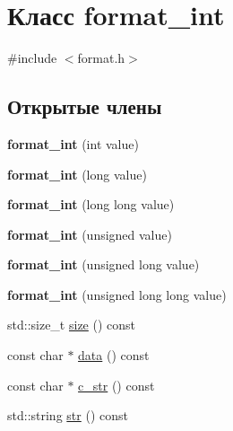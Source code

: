 \hypertarget{classformat__int}{}\section{Класс format\+\_\+int}
\label{classformat__int}


{\ttfamily \#include $<$format.\+h$>$}

\subsection*{Открытые члены}
\begin{DoxyCompactItemize}
\item 
\mbox{\label{classformat__int_a3664fa2bb28b1636eb2ceb8f2a28c5d3}} 
{\bfseries format\+\_\+int} (int value)
\item 
\mbox{\label{classformat__int_a473c02889ad9139f7b6c008de5be9224}} 
{\bfseries format\+\_\+int} (long value)
\item 
\mbox{\label{classformat__int_a72e64eccbef3c56539074d790c4f5811}} 
{\bfseries format\+\_\+int} (long long value)
\item 
\mbox{\label{classformat__int_ad474137ee4a9d0545f0c8a2b3f6f6cf8}} 
{\bfseries format\+\_\+int} (unsigned value)
\item 
\mbox{\label{classformat__int_affccebfca726a18d469e726655401d35}} 
{\bfseries format\+\_\+int} (unsigned long value)
\item 
\mbox{\label{classformat__int_a04c207f578ee7611d897c77ab4a34ff0}} 
{\bfseries format\+\_\+int} (unsigned long long value)
\item 
std\+::size\+\_\+t \hyperlink{classformat__int_a644fe6f2d0505d48ff08ab22448b5069}{size} () const
\item 
const char $\ast$ \hyperlink{classformat__int_a4ecc95eeed01911d1e2dcc4fabc5df5a}{data} () const
\item 
const char $\ast$ \hyperlink{classformat__int_a0ae1671f3ddacb00738133f29549b724}{c\+\_\+str} () const
\item 
std\+::string \hyperlink{classformat__int_ab14204962423d35a320f15e673b08e06}{str} () const
\end{DoxyCompactItemize}


